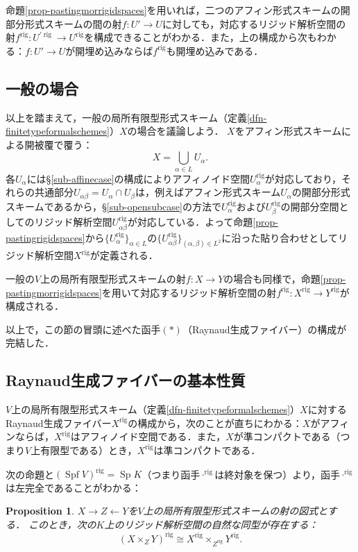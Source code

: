 \documentclass[a4paper,12pt, dvipdfmx]{jsbook}
\def\rig{\mathop{\mathrm{rig}}\nolimits}
\def\Spf{\mathop{\mathrm{Spf}}\nolimits}
\def\Sp{\mathop{\mathrm{Sp}}\nolimits}
\theoremstyle{plain}
\newtheorem{prop}[thm]{\bfseries Proposition}
\theoremstyle{definition}
\begin{document}
命題\ref{prop-pastingmorrigidspaces}を用いれば，二つのアフィン形式スキームの開部分形式スキームの間の射$f\colon U'\rightarrow U$に対しても，対応するリジッド解析空間の射$f^{\rig}\colon U^{\prime\rig}\rightarrow U^{\rig}$を構成できることがわかる．また，上の構成から次もわかる：$f\colon U'\rightarrow U$が開埋め込みならば$f^{\rig}$も開埋め込みである．

\subsection{一般の場合}\label{sub-generalcase}
以上を踏まえて，一般の局所有限型形式スキーム（定義\ref{dfn-finitetypeformalschemes}）$X$の場合を議論しよう．
$X$をアフィン形式スキームによる開被覆で覆う：
$$
X=\bigcup_{\alpha\in L}U_{\alpha}. 
$$
各$U_{\alpha}$には\S\ref{sub-affinecase}の構成によりアフィノイド空間$U^{\rig}_{\alpha}$が対応しており，それらの共通部分$U_{\alpha\beta}=U_{\alpha}\cap U_{\beta}$は，例えばアフィン形式スキーム$U_{\alpha}$の開部分形式スキームであるから，\S\ref{sub-opensubcase}の方法で$U^{\rig}_{\alpha}$および$U^{\rig}_{\beta}$の開部分空間としてのリジッド解析空間$U^{\rig}_{\alpha\beta}$が対応している．よって命題\ref{prop-pastingrigidspaces}から$\{U^{\rig}_{\alpha}\}_{\alpha\in L}$の$\{U^{\rig}_{\alpha\beta}\}_{(\alpha,\beta)\in L^2}$に沿った貼り合わせとしてリジッド解析空間$X^{\rig}$が定義される．

一般の$V$上の局所有限型形式スキームの射$f\colon X\rightarrow Y$の場合も同様で，命題\ref{prop-pastingmorrigidspaces}を用いて対応するリジッド解析空間の射$f^{\rig}\colon X^{\rig}\rightarrow Y^{\rig}$が構成される．

以上で，この節の冒頭に述べた函手$(\ast)$（Raynaud生成ファイバー）の構成が完結した．

\subsection{Raynaud生成ファイバーの基本性質}\label{sub-basicpropertyRaynaudgenericfiber}
$V$上の局所有限型形式スキーム（定義\ref{dfn-finitetypeformalschemes}）$X$に対するRaynaud生成ファイバー$X^{\rig}$の構成から，次のことが直ちにわかる：$X$がアフィンならば，$X^{\rig}$はアフィノイド空間である．また，$X$が準コンパクトである（つまり$V$上有限型である）とき，$X^{\rig}$は準コンパクトである．

次の命題と$(\Spf V)^{\rig}=\Sp K$（つまり函手$\cdot^{\rig}$は終対象を保つ）より，函手$\cdot^{\rig}$は左完全であることがわかる：
\begin{prop}\label{prop-basicpropertyRaynaudgenericfiber1}{\rm 
$X\rightarrow Z\leftarrow Y$を$V$上の局所有限型形式スキームの射の図式とする．
このとき，次の$K$上のリジッド解析空間の自然な同型が存在する：
$$
(X\times_ZY)^{\rig}\cong X^{\rig}\times_{Z^{\rig}}Y^{\rig}.
$$}
\end{prop}
\end{document}
